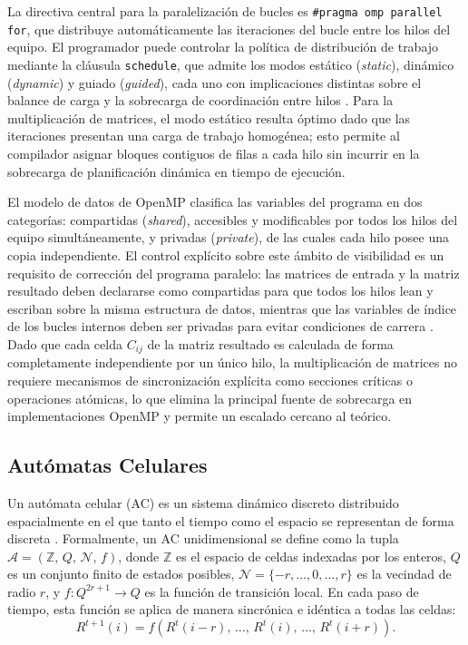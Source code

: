 La directiva central para la paralelización de bucles es \texttt{\#pragma omp parallel for},
que distribuye automáticamente las iteraciones del bucle entre los hilos del equipo. El
programador puede controlar la política de distribución de trabajo mediante la cláusula
\texttt{schedule}, que admite los modos estático (\textit{static}), dinámico (\textit{dynamic})
y guiado (\textit{guided}), cada uno con implicaciones distintas sobre el balance de carga y la
sobrecarga de coordinación entre hilos \parencite{Chapman2008OpenMP}. Para la
multiplicación de matrices, el modo estático resulta óptimo dado que las iteraciones presentan
una carga de trabajo homogénea; esto permite al compilador asignar bloques contiguos de
filas a cada hilo sin incurrir en la sobrecarga de planificación dinámica en tiempo de ejecución.

El modelo de datos de OpenMP clasifica las variables del programa en dos categorías: compartidas
(\textit{shared}), accesibles y modificables por todos los hilos del equipo simultáneamente, y
privadas (\textit{private}), de las cuales cada hilo posee una copia independiente. El control
explícito sobre este ámbito de visibilidad es un requisito de corrección del programa paralelo:
las matrices de entrada y la matriz resultado deben declararse como compartidas para que todos
los hilos lean y escriban sobre la misma estructura de datos, mientras que las variables de
índice de los bucles internos deben ser privadas para evitar condiciones de carrera
\parencite{Chapman2008OpenMP}. Dado que cada celda \(C_{ij}\) de la matriz resultado es
calculada de forma completamente independiente por un único hilo, la multiplicación de
matrices no requiere mecanismos de sincronización explícita como secciones críticas o
operaciones atómicas, lo que elimina la principal fuente de sobrecarga en implementaciones
OpenMP y permite un escalado cercano al teórico.

\subsection{Autómatas Celulares}

Un autómata celular (AC) es un sistema dinámico discreto distribuido
espacialmente en el que tanto el tiempo como el espacio se representan
de forma discreta \parencite{Wolfram1984}. Formalmente, un AC
unidimensional se define como la tupla $\mathcal{A} = (\mathbb{Z},\, Q,\,
\mathcal{N},\, f)$, donde $\mathbb{Z}$ es el espacio de celdas indexadas
por los enteros, $Q$ es un conjunto finito de estados posibles,
$\mathcal{N} = \{-r, \ldots, 0, \ldots, r\}$ es la vecindad de radio $r$,
y $f : Q^{2r+1} \to Q$ es la función de transición local. En cada paso
de tiempo, esta función se aplica de manera sincrónica e idéntica a todas
las celdas:
\[
  R^{t+1}(i) = f\!\left(R^t(i-r),\, \ldots,\, R^t(i),\, \ldots,\,
  R^t(i+r)\right).
\]

